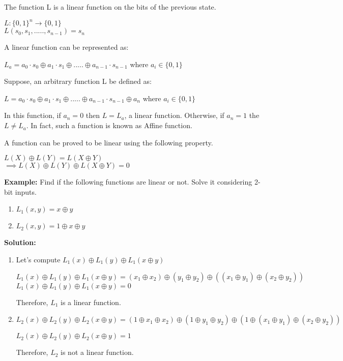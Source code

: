 \documentclass[11pt]{article}
\begin{document}
The function L is a linear function on the bits of the previous state.
\begin{center}
    $L: \{0,1\}^n \rightarrow \{0,1\}$\\
    $L(s_0, s_1,....., s_{n-1}) = s_n$
\end{center}
A linear function can be represented as:
\begin{center}
    $L_a = a_0\cdot s_0 \oplus a_1 \cdot s_1 \oplus ..... \oplus a_{n-1} \cdot s_{n-1}$ where $a_i \in \{0, 1\}$
\end{center}

Suppose, an arbitrary function L be defined as:
\begin{center}
    $L = a_0\cdot s_0 \oplus a_1 \cdot s_1 \oplus ..... \oplus a_{n-1} \cdot s_{n-1} \oplus a_n$ where $a_i \in \{0, 1\}$
\end{center}
In this function, if $a_n = 0$ then $L = L_a$, a linear function. Otherwise, if $a_n = 1$ the $L \neq L_a$. In fact, such a function is known as Affine function.

A function can be proved to be linear using the following property.
\begin{center}
    $L(X) \oplus L(Y) = L(X \oplus Y)$\\
    $\implies L(X) \oplus L(Y) \oplus L(X \oplus Y) = 0$
\end{center}

\textbf{Example:} Find if the following functions are linear or not. Solve it considering 2-bit inputs.
\begin{enumerate}
    \item $L_1(x, y) = x \oplus y$
    \item $L_2(x, y) = 1 \oplus x \oplus y$

\end{enumerate}
\textbf{Solution:} 
\begin{enumerate}
    \item Let's compute $L_1(x) \oplus L_1(y) \oplus L_1(x \oplus y)$
    \begin{center}
        $L_1(x) \oplus L_1(y) \oplus L_1(x \oplus y) = (x_1 \oplus x_2) \oplus (y_1 \oplus y_2) \oplus ((x_1 \oplus y_1) \oplus (x_2 \oplus y_2))$\\
        \vspace{1mm}
        $L_1(x) \oplus L_1(y) \oplus L_1(x \oplus y) = 0$
    \end{center}
    Therefore, $L_1$ is a linear function.
    \item $L_2(x) \oplus L_2(y) \oplus L_2(x \oplus y) = (1 \oplus x_1 \oplus x_2) \oplus (1 \oplus y_1 \oplus y_2) \oplus (1 \oplus (x_1 \oplus y_1) \oplus (x_2 \oplus y_2))$
    \begin{center}
        $L_2(x) \oplus L_2(y) \oplus L_2(x \oplus y) = 1 $
    \end{center}
    Therefore, $L_2$ is not a linear function.
\end{enumerate}
\end{document}

